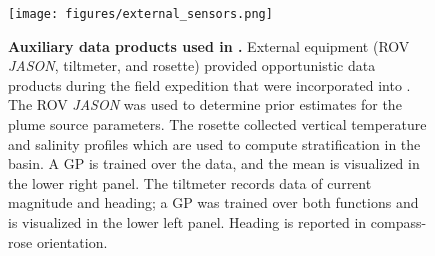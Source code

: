 \begin{figure}[h!]
    \centering
    \texttt{[image: figures/external\_sensors.png]}
    \caption{\textbf{Auxiliary data products used in \PHUMES.} External equipment (ROV \emph{JASON}, tiltmeter, and rosette) provided opportunistic data products during the field expedition that were incorporated into \PHUMES. The ROV \emph{JASON} was used to determine prior estimates for the plume source parameters. The rosette collected vertical temperature and salinity profiles which are used to compute stratification in the basin. A GP is trained over the data, and the mean is visualized in the lower right panel. The tiltmeter records data of current magnitude and heading; a GP was trained over both functions and is visualized in the lower left panel. Heading is reported in compass-rose orientation.}
    \label{fig:ext_sensors}
\end{figure}




